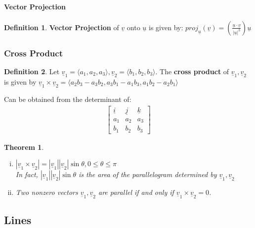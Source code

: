 \documentclass[12 pt]{article}
\newtheorem{thm}{Theorem}
\theoremstyle{definition}
\newtheorem{defn}{Definition}
\begin{document}
\paragraph{Vector Projection} \begin{defn}
	\textbf{Vector Projection} of $\underline{v}$ onto $\underline{u}$ is given by: $proj_{\underline{u}}(\underline{v})=\left(\frac{\underline{u}\cdot \underline{v}}{|\underline{u}|^2}\right)\underline{u}$
\end{defn}
\subsubsection{Cross Product} 
\begin{defn}
	Let $\underline{v}_1=\langle a_1, a_2, a_3 \rangle, \underline{v}_2=\langle b_1,b_2,b_3 \rangle.$ The \textbf{cross product} of $\underline{v}_1,\underline{v}_2$ is given by $\underline{v}_1 \times \underline{v}_2 = \langle a_2b_3-a_3b_2,a_3b_1-a_1b_3,a_1b_2-a_2b_1 \rangle$ 
\end{defn}
Can be obtained from the determinant of:
\begin{align*}
	\left[\begin{matrix}
	\underline{i} & \underline{j} & \underline{k}
	\\ a_1 & a_2 & a_3
	\\ b_1 & b_2 & b_3 
	\end{matrix}\right]
\end{align*}
\begin{thm}
	\begin{enumerate}[i)]
		\item $|\underline{v}_1 \times \underline{v}_2|=|\underline{v}_1||\underline{v}_2|\sin{\theta}, 0\leq \theta \leq \pi $
		\\ In fact, $|\underline{v}_1||\underline{v}_2|\sin{\theta}$ is the area of the parallelogram determined by $\underline{v}_1,\underline{v}_2$
		\item Two nonzero vectors $\underline{v}_1,\underline{v}_2$ are parallel if and only if $\underline{v}_1 \times \underline{v}_2=0$. 
	\end{enumerate}
\end{thm}
\subsection{Lines}
\end{document}
